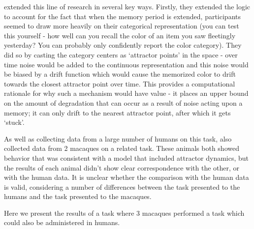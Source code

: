 \cite{panichello_error-correcting_2019} extended this line of research in several key ways. 
Firstly, they extended the logic to account for the fact that when the memory period is extended, participants seemed to draw more heavily on their categorical representation (you can test this yourself - how well can you recall the color of an item you saw fleetingly yesterday? 
You can probably only confidently report the color category). 
They did so by casting the category centers as `attractor points' in the space - over time noise would be added to the continuous representation and this noise would be biased by a drift function which would cause the memorized color to drift towards the closest attractor point over time. 
This provides a computational rationale for why such a mechanism would have value - it places an upper bound on the amount of degradation that can occur as a result of noise acting upon a memory; it can only drift to the nearest attractor point, after which it gets `stuck'.

As well as collecting data from a large number of humans on this task, \cite{panichello_error-correcting_2019} also collected data from 2 macaques on a related task. 
These animals both showed behavior that was consistent with a model that included attractor dynamics, but the results of each animal didn't show clear correspondence with the other, or with the human data.
It is unclear whether the comparison with the human data is valid, considering a number of differences between the task presented to the humans and the task presented to the macaques.

Here we present the results of a task where 3 macaques performed a task which could also be administered in humans.